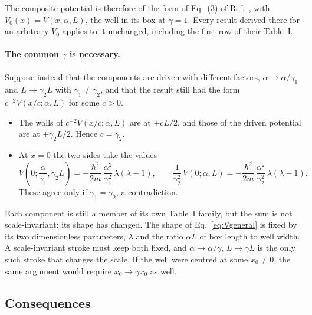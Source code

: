 \documentclass[11pt]{article}
\numberwithin{equation}{section}
\begin{document}
\medskip
The composite potential is therefore of the form of Eq.~(3) of Ref.~\cite{deffner2014}, with $V_0(x)=V(x;\alpha,L)$, the well in its box at $\gamma=1$. Every result derived there for an arbitrary $V_0$ applies to it unchanged, including the first row of their Table~I.

\paragraph{The common $\gamma$ is necessary.} Suppose instead that the components are driven with different factors, $\alpha\to\alpha/\gamma_1$ and $L\to\gamma_2L$ with $\gamma_1\neq\gamma_2$, and that the result still had the form $c^{-2}V(x/c;\alpha,L)$ for some $c>0$.
\begin{itemize}[itemsep=2pt]
\item The walls of $c^{-2}V(x/c;\alpha,L)$ are at $\pm cL/2$, and those of the driven potential are at $\pm\gamma_2L/2$. Hence $c=\gamma_2$.
\item At $x=0$ the two sides take the values
\[
V\!\left(0;\frac{\alpha}{\gamma_1},\gamma_2L\right)=-\frac{\hbar^2}{2m}\,\frac{\alpha^2}{\gamma_1^2}\,\lambda(\lambda-1),\qquad
\frac{1}{\gamma_2^2}\,V(0;\alpha,L)=-\frac{\hbar^2}{2m}\,\frac{\alpha^2}{\gamma_2^2}\,\lambda(\lambda-1).
\]
These agree only if $\gamma_1=\gamma_2$, a contradiction.
\end{itemize}
Each component is still a member of its own Table~I family, but the sum is not scale-invariant: its shape has changed. The shape of Eq.~\eqref{eq:Vgeneral} is fixed by its two dimensionless parameters, $\lambda$ and the ratio $\alpha L$ of box length to well width. A scale-invariant stroke must keep both fixed, and $\alpha\to\alpha/\gamma$, $L\to\gamma L$ is the only such stroke that changes the scale. If the well were centred at some $x_0\neq0$, the same argument would require $x_0\to\gamma x_0$ as well.

\subsection{Consequences}
\end{document}
